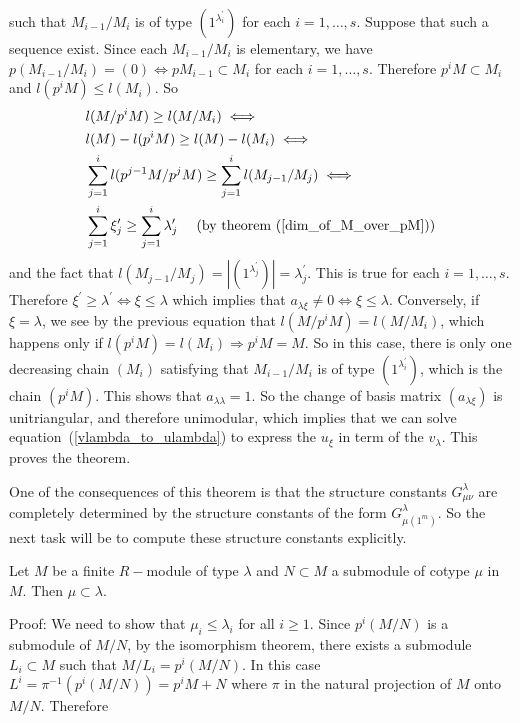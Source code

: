 such that $M_{i-1}/M_i$ is of type $(1^{\lambda_i^\prime})$ for each $i=1,\dots,s$. Suppose that such a sequence exist. Since each $M_{i-1}/M_i$ is elementary, we have $p(M_{i-1}/M_i)=(0)\iff pM_{i-1}\subset M_i$ for each $i=1,\dots,s$. Therefore $p^iM\subset M_i$ and $l(p^iM)\leq l(M_i)$. So
\begin{equation}
    \begin{split}
        &l(M/p^iM)\geq l(M/M_i)\iff \\
        &l(M)-l(p^iM)\geq l(M)-l(M_i) \iff\\
        &\sum_{j=1}^{i}l(p^{j-1}M/p^jM)\geq \sum_{j=1}^{i}l(M_{j-1}/M_j)\iff\\
        &\sum_{j=1}^{i}\xi_j^\prime\geq \sum_{j=1}^{i}\lambda_j^\prime\quad\text{ (by theorem~(\ref{dim_of_M_over_pM})}) 
    \end{split}
\end{equation}
and the fact that $l(M_{j-1}/M_j)=|(1^{\lambda_j^\prime})|=\lambda_j^\prime$. This is true for each $i=1,\dots, s$. Therefore $\xi^\prime\geq\lambda^\prime\iff \xi\leq \lambda$ which implies that $a_{\lambda\xi}\neq0\iff \xi\leq \lambda$. Conversely, if $\xi=\lambda$, we see by the previous equation that $l(M/p^iM)= l(M/M_i)$, which happens only if $l(p^iM)=l(M_i)\Rightarrow p^iM=M$. So in this case, there is only one decreasing chain $(M_i)$ satisfying that $M_{i-1}/M_i$ is of type $(1^{\lambda_i^\prime})$, which is the chain $(p^iM)$. This shows that $a_{\lambda\lambda}=1$. So the change of basis matrix $(a_{\lambda\xi})$ is unitriangular, and therefore unimodular, which implies that we can solve equation~(\ref{vlambda_to_ulambda}) to express the $u_\xi$ in term of the $v_\lambda$. This proves the theorem.\par
One of the consequences of this theorem is that the structure constants $G_{\mu\nu}^\lambda$ are completely determined by the structure constants of the form $G_{\mu(1^m)}^\lambda$. So the next task will be to compute these structure constants explicitly.
\begin{dang}
    \begin{lemma}\label{cotype_contained_in_type}\cite{macdonald1998symmetric}
        Let $M$ be a finite $R-$module of type $\lambda$ and $N\subset M$ a submodule of cotype $\mu$ in $M$. Then $\mu\subset \lambda$.
    \end{lemma}
\end{dang}
Proof: We need to show that $\mu_i\leq\lambda_i$ for all $i\geq1$. Since $p^i(M/N)$ is a submodule of $M/N$, by the isomorphism theorem, there exists a submodule $L_i\subset M$ such that $M/L_i=p^i(M/N)$. In this case $L^i=\pi^{-1}(p^i(M/N))=p^iM+N$ where $\pi$ in the natural projection of $M$ onto $M/N$. Therefore

